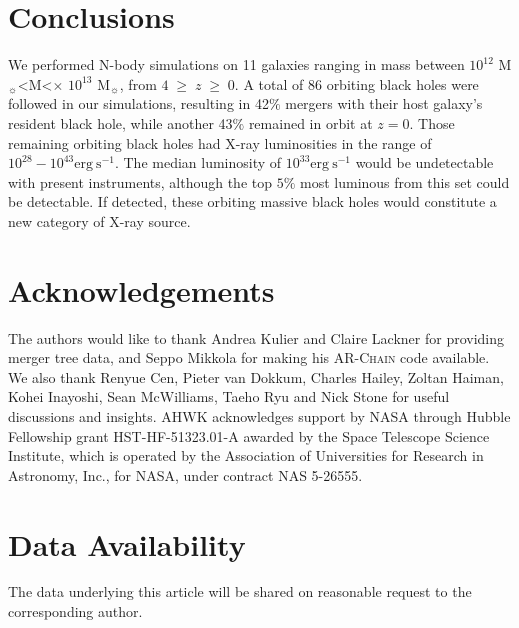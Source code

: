 \documentclass[fleqn,usenatbib,useAMS]{mnras}
\begin{document}
\section{Conclusions}\label{sec:conclusions}
We performed N-body simulations on 11 galaxies ranging in mass between $10^{12}$ M$_{\sun}$\;<\;M\;<$\times$ $10^{13}$ M$_{\sun}$, from $4\;\geq\;z\;\geq\;0$.  A total of 86 orbiting black holes were followed in our simulations, resulting in 42$\%$ mergers with their host galaxy's resident black hole, while another 43$\%$ remained in orbit at $z=0$.  Those remaining orbiting black holes had X-ray luminosities in the range of $10^{28}-10^{43}\mathrm{erg}~\mathrm{s}^{-1}$.  The median luminosity of $10^{33}\mathrm{erg}~\mathrm{s}^{-1}$ would be undetectable with present instruments, although the top $5\%$ most luminous from this set could be detectable.  If detected, these orbiting massive black holes would constitute a new category of X-ray source.

\section{Acknowledgements}
The authors would like to thank Andrea Kulier and Claire Lackner for providing merger tree data, and Seppo Mikkola for making his \textsc{AR-Chain} code available. We also thank Renyue Cen, Pieter van Dokkum, Charles Hailey, Zoltan Haiman, Kohei Inayoshi, Sean McWilliams, Taeho Ryu and Nick Stone for useful discussions and insights.  AHWK acknowledges support by NASA through Hubble Fellowship grant HST-HF-51323.01-A awarded by the Space Telescope Science Institute, which is operated by the Association of Universities for Research in Astronomy, Inc., for NASA, under contract NAS 5-26555.

\section{Data Availability}
The data underlying this article will be shared on reasonable request to the corresponding author.







\bsp	%
\label{lastpage}
\end{document}
